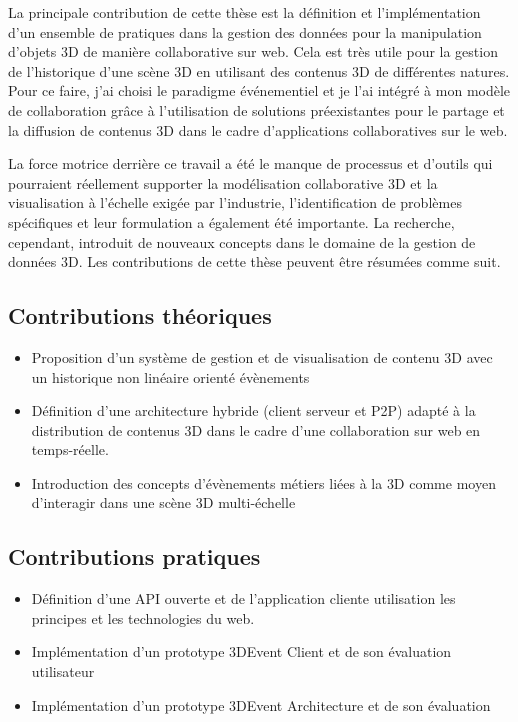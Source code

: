 La principale contribution de cette thèse est la définition et l'implémentation d'un 
ensemble de pratiques dans la gestion des données pour la manipulation d'objets 
3D de manière collaborative sur web. Cela est très utile pour la gestion de 
l'historique d'une scène \gls{3D} en utilisant des contenus \gls{3D} de différentes 
natures. Pour ce faire, j'ai choisi le paradigme événementiel et je l'ai 
intégré à mon modèle de collaboration grâce à l'utilisation de solutions 
préexistantes pour le partage et la diffusion de contenus \gls{3D} dans le cadre 
d'applications collaboratives sur le web.

La force motrice derrière ce travail a été le manque de processus et d'outils qui 
pourraient réellement supporter la modélisation collaborative \gls{3D} et la 
visualisation à l'échelle exigée par l'industrie, l'identification de problèmes 
spécifiques et leur formulation a également été importante. La recherche, 
cependant, introduit de nouveaux concepts dans le domaine de la gestion de 
données \gls{3D}. Les contributions de cette thèse peuvent être résumées comme 
suit.


\subsection{Contributions théoriques}

\begin{itemize}
	\item {}Proposition d'un système de 
	gestion et de visualisation de contenu \gls{3D} avec un historique non linéaire 
	orienté évènements
	\item Définition d'une architecture hybride (client serveur et \gls{P2P}) adapté à 
	la distribution de contenus \gls{3D} dans le cadre d'une collaboration sur web en 
	temps-réelle.
	\item Introduction des concepts d'évènements métiers liées à la \gls{3D} 
	comme moyen d'interagir dans une scène  \gls{3D} multi-échelle
\end{itemize}
\subsection{Contributions pratiques}
\begin{itemize}
	\item {}Définition d'une API ouverte et 
	de l'application cliente utilisation les principes et les technologies du web.
	\item Implémentation d'un prototype 3DEvent Client et de son évaluation 
	utilisateur 
	\item Implémentation d'un prototype 3DEvent Architecture et de son évaluation
	
\end{itemize}

